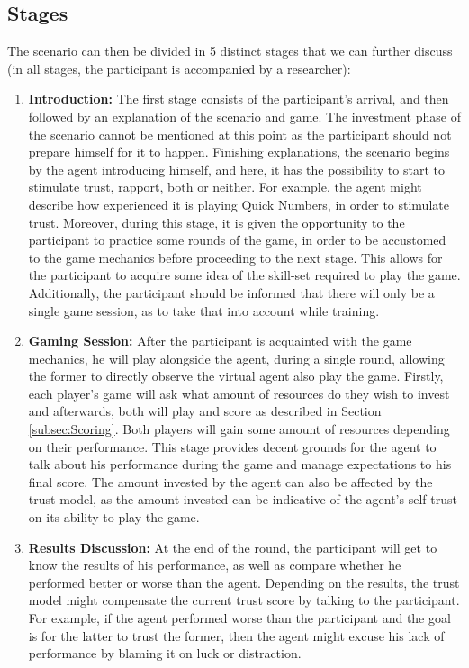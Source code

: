 \subsection{Stages}
\label{sub:stages}
The scenario can then be divided in 5 distinct stages that we can further discuss (in all stages, the participant is accompanied by a researcher):
\begin{enumerate}[label=\textbf{\arabic*.}]
    \item \textbf{Introduction:} The first stage consists of the participant's arrival, and then followed by an explanation of the scenario and game. The investment phase of the scenario cannot be mentioned at this point as the participant should not prepare himself for it to happen. Finishing explanations, the scenario begins by the agent introducing himself, and here, it has the possibility to start to stimulate trust, rapport, both or neither. For example, the agent might describe how experienced it is playing Quick Numbers, in order to stimulate trust. Moreover, during this stage, it is given the opportunity to the participant to practice some rounds of the game, in order to be accustomed to the game mechanics before proceeding to the next stage. This allows for the participant to acquire some idea of the skill-set required to play the game. Additionally, the participant should be informed that there will only be a single game session, as to take that into account while training.
    
    \item \textbf{Gaming Session:} After the participant is acquainted with the game mechanics, he will play alongside the agent, during a single round, allowing the former to directly observe the virtual agent also play the game. Firstly, each player's game will ask what amount of resources do they wish to invest and afterwards, both will play and score as described in Section \ref{subsec:Scoring}. Both players will gain some amount of resources depending on their performance. This stage provides decent grounds for the agent to talk about his performance during the game and manage expectations to his final score. The amount invested by the agent can also be affected by the trust model, as the amount invested can be indicative of the agent's self-trust on its ability to play the game.
    
    \item \textbf{Results Discussion:} At the end of the round, the participant will get to know the results of his performance, as well as compare whether he performed better or worse than the agent. Depending on the results, the trust model might compensate the current trust score by talking to the participant. For example, if the agent performed worse than the participant and the goal is for the latter to trust the former, then the agent might excuse his lack of performance by blaming it on luck or distraction. 
    

\end{enumerate}
